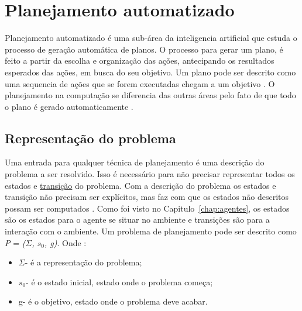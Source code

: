 \chapter{\label{chap:planejamento}Planejamento automatizado}

Planejamento automatizado é uma sub-área da inteligencia artificial que estuda o processo de geração automática de planos. 
O processo para gerar um plano, é feito a partir da escolha e organização das ações, antecipando os resultados esperados das ações, em busca do seu objetivo. Um plano pode ser descrito como uma sequencia de ações que se forem executadas chegam a um objetivo \cite{ghallab2004automated}. O planejamento na computação se diferencia das outras áreas pelo fato de que todo o plano é gerado automaticamente \cite{intelligence2003modern}. 

\section{Representação do problema}
Uma entrada para qualquer técnica de planejamento é uma descrição do problema a ser resolvido. 
Isso é necessário para não precisar representar todos os estados e \underline{transição} do problema. 
Com a descrição do problema os estados e transição não precisam ser explícitos, mas faz com que os estados não descritos possam ser computados \cite{ghallab2004automated}. 
Como foi visto no Capitulo~\ref{chap:agentes}, os estados são os estados para o agente se situar no ambiente e transições são para a interação com o ambiente. 
Um problema de planejamento pode ser descrito como \textit{P} = \textit{($\Sigma$, $s_{0}$, g)}. 
Onde \cite{ghallab2004automated}:

\begin{itemize}
	\item $\Sigma$- é a representação do problema;
	\item $s_{0}$- é o estado inicial, estado onde o problema começa;
	\item g- é o objetivo, estado onde o problema deve acabar.
\end{itemize}

